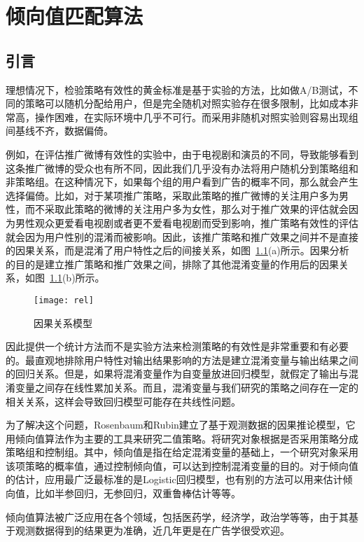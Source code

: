 \chapter{倾向值匹配算法}

\section{引言}

理想情况下，检验策略有效性的黄金标准是基于实验的方法，比如做A/B测试，不同的策略可以随机分配给用户，但是完全随机对照实验存在很多限制，比如成本非常高，操作困难，在实际环境中几乎不可行。而采用非随机对照实验则容易出现组间基线不齐，数据偏倚。

例如，在评估推广微博有效性的实验中，由于电视剧和演员的不同，导致能够看到这条推广微博的受众也有所不同，因此我们几乎没有办法将用户随机分到策略组和非策略组。在这种情况下，如果每个组的用户看到广告的概率不同，那么就会产生选择偏倚。比如，对于某项推广策略，采取此策略的推广微博的关注用户多为男性，而不采取此策略的微博的关注用户多为女性，那么对于推广效果的评估就会因为男性观众更爱看电视剧或者更不爱看电视剧而受到影响，推广策略有效性的评估就会因为用户性别的混淆而被影响。因此，该推广策略和推广效果之间并不是直接的因果关系，而是混淆了用户特性之后的间接关系，如图~\ref{rel}(a)所示。因果分析的目的是建立推广策略和推广效果之间，排除了其他混淆变量的作用后的因果关系，如图~\ref{rel}(b)所示。

\begin{figure}[!htbp]
\centering
\texttt{[image: rel]}
\caption{因果关系模型}
\label{rel}
\end{figure}

因此提供一个统计方法而不是实验方法来检测策略的有效性是非常重要和有必要的。最直观地排除用户特性对输出结果影响的方法是建立混淆变量与输出结果之间的回归关系。但是，如果将混淆变量作为自变量放进回归模型，就假定了输出与混淆变量之间存在线性累加关系。而且，混淆变量与我们研究的策略之间存在一定的相关关系，这样会导致回归模型可能存在共线性问题。

为了解决这个问题，Rosenbaum和Rubin建立了基于观测数据的因果推论模型\cite{rosenbaum1983central}，它用倾向值算法作为主要的工具来研究二值策略。将研究对象根据是否采用策略分成策略组和控制组。其中，倾向值是指在给定混淆变量的基础上，一个研究对象采用该项策略的概率值，通过控制倾向值，可以达到控制混淆变量的目的。对于倾向值的估计，应用最广泛最标准的是Logistic回归模型，也有别的方法可以用来估计倾向值，比如半参回归，无参回归，双重鲁棒估计等等。

倾向值算法被广泛应用在各个领域，包括医药学，经济学，政治学等等，由于其基于观测数据得到的结果更为准确，近几年更是在广告学很受欢迎。


